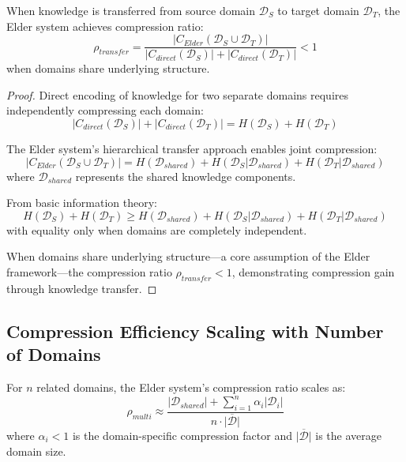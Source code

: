 \begin{theorem}
When knowledge is transferred from source domain $\mathcal{D}_S$ to target domain $\mathcal{D}_T$, the Elder system achieves compression ratio:
\begin{equation}
\rho_{transfer} = \frac{|C_{Elder}(\mathcal{D}_S \cup \mathcal{D}_T)|}{|C_{direct}(\mathcal{D}_S)| + |C_{direct}(\mathcal{D}_T)|} < 1
\end{equation}
when domains share underlying structure.
\end{theorem}

\begin{proof}
Direct encoding of knowledge for two separate domains requires independently compressing each domain:
\begin{equation}
|C_{direct}(\mathcal{D}_S)| + |C_{direct}(\mathcal{D}_T)| = H(\mathcal{D}_S) + H(\mathcal{D}_T)
\end{equation}

The Elder system's hierarchical transfer approach enables joint compression:
\begin{equation}
|C_{Elder}(\mathcal{D}_S \cup \mathcal{D}_T)| = H(\mathcal{D}_{shared}) + H(\mathcal{D}_S | \mathcal{D}_{shared}) + H(\mathcal{D}_T | \mathcal{D}_{shared})
\end{equation}
where $\mathcal{D}_{shared}$ represents the shared knowledge components.

From basic information theory:
\begin{equation}
H(\mathcal{D}_S) + H(\mathcal{D}_T) \geq H(\mathcal{D}_{shared}) + H(\mathcal{D}_S | \mathcal{D}_{shared}) + H(\mathcal{D}_T | \mathcal{D}_{shared})
\end{equation}
with equality only when domains are completely independent.

When domains share underlying structure—a core assumption of the Elder framework—the compression ratio $\rho_{transfer} < 1$, demonstrating compression gain through knowledge transfer.
\end{proof}

\subsection{Compression Efficiency Scaling with Number of Domains}

\begin{theorem}
For $n$ related domains, the Elder system's compression ratio scales as:
\begin{equation}
\rho_{multi} \approx \frac{|\mathcal{D}_{shared}| + \sum_{i=1}^n \alpha_i |\mathcal{D}_i|}{n \cdot \overline{|\mathcal{D}|}}
\end{equation}
where $\alpha_i < 1$ is the domain-specific compression factor and $\overline{|\mathcal{D}|}$ is the average domain size.
\end{theorem}

